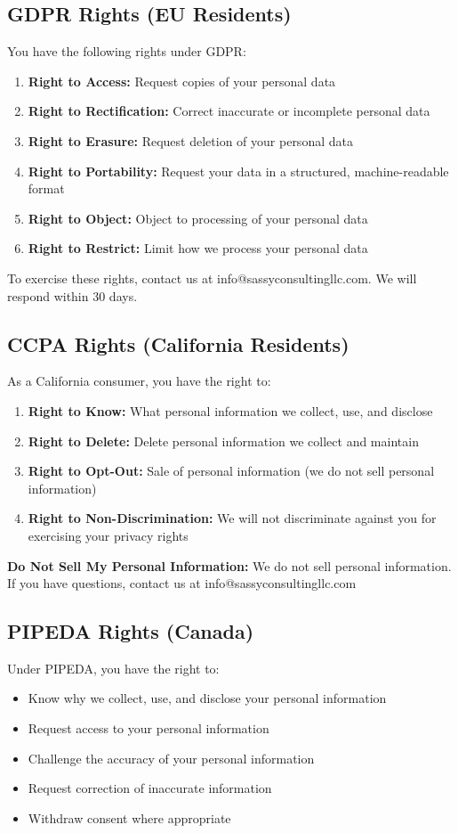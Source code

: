 \documentclass[11pt,letterpaper]{article}
\begin{document}
\subsection{GDPR Rights (EU Residents)}
You have the following rights under GDPR:

\begin{enumerate}
    \item \textbf{Right to Access:} Request copies of your personal data
    \item \textbf{Right to Rectification:} Correct inaccurate or incomplete personal data
    \item \textbf{Right to Erasure:} Request deletion of your personal data
    \item \textbf{Right to Portability:} Request your data in a structured, machine-readable format
    \item \textbf{Right to Object:} Object to processing of your personal data
    \item \textbf{Right to Restrict:} Limit how we process your personal data
\end{enumerate}

To exercise these rights, contact us at info@sassyconsultingllc.com. We will respond within 30 days.

\subsection{CCPA Rights (California Residents)}
As a California consumer, you have the right to:

\begin{enumerate}
    \item \textbf{Right to Know:} What personal information we collect, use, and disclose
    \item \textbf{Right to Delete:} Delete personal information we collect and maintain
    \item \textbf{Right to Opt-Out:} Sale of personal information (we do not sell personal information)
    \item \textbf{Right to Non-Discrimination:} We will not discriminate against you for exercising your privacy rights
\end{enumerate}

\textbf{Do Not Sell My Personal Information:} We do not sell personal information. If you have questions, contact us at info@sassyconsultingllc.com

\subsection{PIPEDA Rights (Canada)}
Under PIPEDA, you have the right to:
\begin{itemize}
    \item Know why we collect, use, and disclose your personal information
    \item Request access to your personal information
    \item Challenge the accuracy of your personal information
    \item Request correction of inaccurate information
    \item Withdraw consent where appropriate
\end{itemize}
\end{document}
